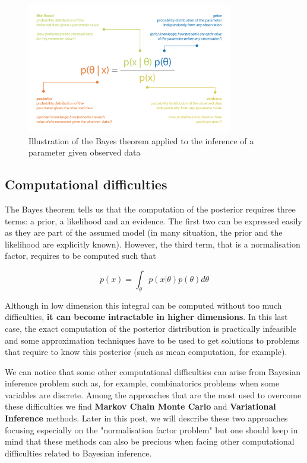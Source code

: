 \begin{figure}[h]
    \centering
\includegraphics[width=0.8\textwidth]{pic/p05c07-snip01.png}
    \caption{Illustration of the Bayes theorem applied to the inference of a parameter given observed data}
    \label{fig:p05c07-snip01}
\end{figure}


\subsection{Computational difficulties}

The Bayes theorem tells us that the computation of the posterior requires three terms: a prior, a likelihood and an evidence. The first two can be expressed easily as they are part of the assumed model (in many situation, the prior and the likelihood are explicitly known). However, the third term, that is a normalisation factor, requires to be computed such that

\begin{equation}p(x)=\int_{\theta} p(x | \theta) p(\theta) d \theta\end{equation}

Although in low dimension this integral can be computed without too much difficulties, \textbf{it can become intractable in higher dimensions}. In this last case, the exact computation of the posterior distribution is practically infeasible and some approximation techniques have to be used to get solutions to problems that require to know this posterior (such as mean computation, for example).

We can notice that some other computational difficulties can arise from Bayesian inference problem such as, for example, combinatorics problems when some variables are discrete. Among the approaches that are the most used to overcome these difficulties we find \textbf{Markov Chain Monte Carlo} and \textbf{Variational Inference} methods. Later in this post, we will describe these two approaches focusing especially on the "normalisation factor problem" but one should keep in mind that these methods can also be precious when facing other computational difficulties related to Bayesian inference.

